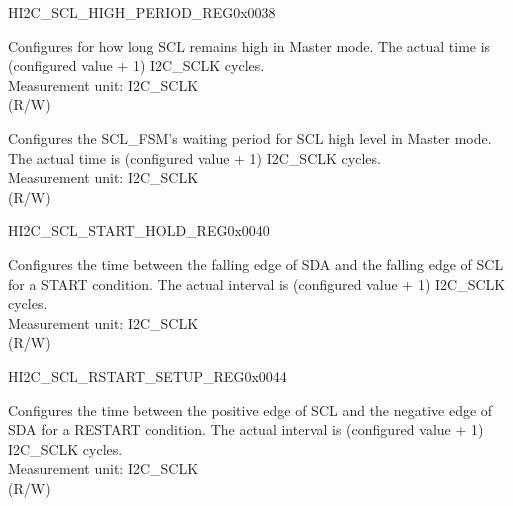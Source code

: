 \begin{register}{H}{I2C\_SCL\_HIGH\_PERIOD\_REG}{0x0038}\label{regdesc:I2CSCLHIGHPERIODREG}
%
%
%
\regnewline%
\begin{regdesc}\begin{reglist}
\label{fielddesc:I2CSCLHIGHPERIOD}\item [I2C\_SCL\_HIGH\_PERIOD] Configures for how long SCL remains high in Master mode. The actual time is (configured value + 1) I2C\_SCLK cycles.\\
Measurement unit: I2C\_SCLK \\ (R/W)
\label{fielddesc:I2CSCLWAITHIGHPERIOD}\item [I2C\_SCL\_WAIT\_HIGH\_PERIOD] Configures the SCL\_FSM's waiting period for SCL high level in Master mode. The actual time is (configured value + 1) I2C\_SCLK cycles.\\
Measurement unit: I2C\_SCLK \\ (R/W)
\end{reglist}\end{regdesc}
\end{register}


\begin{register}{H}{I2C\_SCL\_START\_HOLD\_REG}{0x0040}\label{regdesc:I2CSCLSTARTHOLDREG}
%
%
\regnewline%
\begin{regdesc}\begin{reglist}
\label{fielddesc:I2CSCLSTARTHOLDTIME}\item [I2C\_SCL\_START\_HOLD\_TIME] Configures the time between the falling edge of SDA and the falling edge of SCL for a START condition. The actual interval is (configured value + 1) I2C\_SCLK cycles.\\
Measurement unit: I2C\_SCLK \\ (R/W)
\end{reglist}\end{regdesc}
\end{register}


\begin{register}{H}{I2C\_SCL\_RSTART\_SETUP\_REG}{0x0044}\label{regdesc:I2CSCLRSTARTSETUPREG}
%
%
\regnewline%
\begin{regdesc}\begin{reglist}
\label{fielddesc:I2CSCLRSTARTSETUPTIME}\item [I2C\_SCL\_RSTART\_SETUP\_TIME] Configures the time between the positive edge of SCL and the negative edge of SDA for a RESTART condition. The actual interval is (configured value + 1) I2C\_SCLK cycles.\\
Measurement unit: I2C\_SCLK \\ (R/W)
\end{reglist}\end{regdesc}
\end{register}


